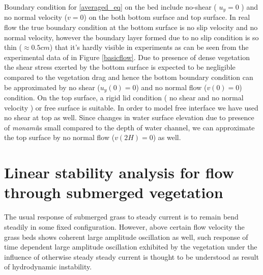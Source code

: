 \documentclass[12pt]{report}   %
\newcommand{\monami}{\textit{monami}}
\begin{document}
Boundary condition for \eqref{averaged_eq} on the bed include no-shear ( $u_y=0$ ) and no normal velocity ($v=0$) on the both bottom surface and top surface.
In real flow the true boundary condition at the bottom surface is no slip velocity and no normal velocity, however the boundary layer formed due to no slip condition is so thin ($\approx 0.5 cm$) that it's hardly visible in experiments as can be seen from the experimental data of \cite{Nepf04} in Figure \ref{basicflow}. Due to presence of dense vegetation the shear stress exerted by the bottom surface is expected to be negligible compared to the vegetation drag \cite{Nepf04} and hence the bottom boundary condition can be approximated by no shear ($u_y(0)=0$) and no normal flow ($v(0)=0$) condition.
On the top surface, a rigid lid condition ( no shear and no normal velocity ) or free surface is suitable. In order to model free interface we have used no shear at top as well. Since changes in water surface elevation due to presence of \monami  is small compared to the depth of water channel, we can approximate the top surface by no normal flow ($v(2H)=0$) as well.  %
%
\clearpage{\pagestyle{empty}\cleardoublepage}
\chapter{Linear stability analysis for flow through submerged vegetation}
The usual response of submerged grass to steady current is to remain bend steadily in some fixed configuration. However, above certain flow velocity the grass beds shows coherent large amplitude oscillation as well, such response of time dependent large amplitude oscillation exhibited by the vegetation under the influence of otherwise steady steady current is thought to be understood as result of hydrodynamic instability. 
\end{document}
